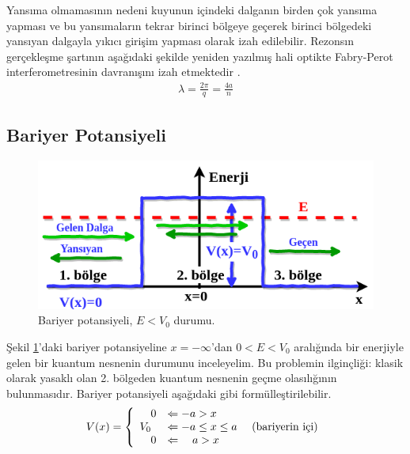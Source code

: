 \documentclass[a4paper,12pt, twoside]{article}
\begin{document}
Yansıma olmamasının nedeni kuyunun içindeki dalganın birden çok yansıma yapması ve bu yansımaların tekrar birinci bölgeye geçerek birinci bölgedeki yansıyan dalgayla yıkıcı girişim yapması olarak izah edilebilir. Rezonsın gerçekleşme şartının
aşağıdaki şekilde yeniden yazılmış hali optikte Fabry-Perot interferometresinin davranışını izah etmektedir \cite{book:Gasiorowicz}.
\begin{align}
\lambda=\frac{2 \pi}{q}=\frac{4 a}{n}
\end{align}

\subsection{Bariyer Potansiyeli}
\begin{figure}[hbtp]
	\centering
	\includegraphics[width=0.62\linewidth]{figurler/Bariyer_Potansiyeli.png}
	\caption{Bariyer potansiyeli, $E<V_0$ durumu.}
	\label{fig:bariyerpotansiyeli}
\end{figure}
Şekil \ref{fig:bariyerpotansiyeli}'daki bariyer potansiyeline $x=-\infty$'dan $0<E<V_0$ aralığında bir enerjiyle gelen bir kuantum nesnenin durumunu inceleyelim. Bu problemin ilginçliği: klasik olarak yasaklı olan 2. bölgeden kuantum nesnenin geçme olasılığının bulunmasıdır. Bariyer potansiyeli aşağıdaki gibi formülleştirilebilir.
\begin{align}
V ( x )  = \left\{ 
\begin{array} { l l } 
{ \quad 0 } & {\Leftarrow -a > x } \\
{V _ { 0 } } & {\Leftarrow -a \leq x \leq a } \quad \text{ (bariyerin içi)} \\
{ \quad 0 } & {\Leftarrow \quad a > x }
\end{array} \right. 
\label{eq:sonlukuyupotansiyeli}
\end{align}
\end{document}
